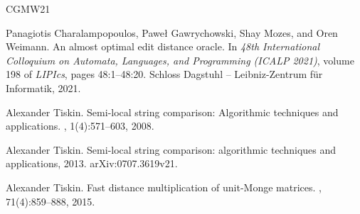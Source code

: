 \documentclass[10pt]{article}
\begin{document}
\begin{thebibliography}{CGMW21}

Panagiotis Charalampopoulos, Pawe{\l} Gawrychowski, Shay Mozes, and Oren
  Weimann.
\newblock An almost optimal edit distance oracle.
\newblock In {\em 48th International Colloquium on Automata, Languages, and
  Programming (ICALP 2021)}, volume 198 of {\em LIPIcs}, pages 48:1--48:20.
  Schloss Dagstuhl -- Leibniz-Zentrum f\"{u}r Informatik, 2021.

Alexander Tiskin.
\newblock Semi-local string comparison: Algorithmic techniques and
  applications.
, 1(4):571--603, 2008.

Alexander Tiskin.
\newblock Semi-local string comparison: algorithmic techniques and
  applications, 2013.
\newblock arXiv:0707.3619v21.

Alexander Tiskin.
\newblock Fast distance multiplication of unit-{M}onge matrices.
, 71(4):859--888, 2015.

\end{thebibliography}
\end{document}
